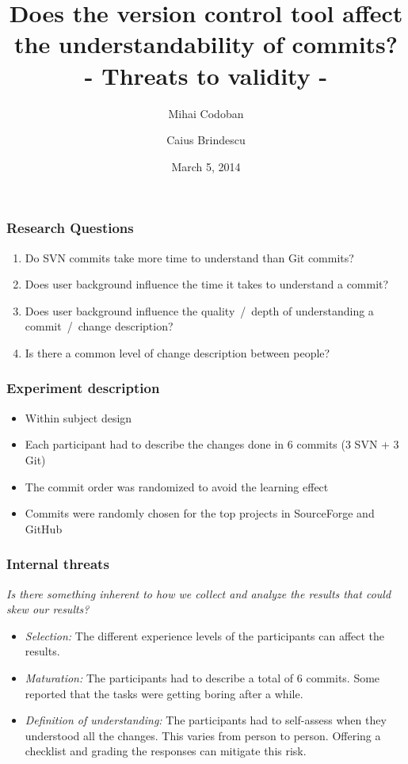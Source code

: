 \documentclass{beamer}
\title{Does the version control tool affect the understandability of commits? \\ - Threats to validity - }
\author{Mihai Codoban \and Caius Brindescu}
\date{March 5, 2014}
\begin{document}
\begin{frame}
\titlepage
\end{frame}

\begin{frame}
\frametitle{Research Questions}
\begin{enumerate}
	\item Do SVN commits take more time to understand than Git commits?
	\item Does user background influence the time it takes to understand a commit?
	\item Does user background influence the quality~/~depth of understanding a commit~/~change description?
	\item Is there a common level of change description between people?
\end{enumerate}
\end{frame}

\begin{frame}
\frametitle{Experiment description}
\begin{itemize}
	\item Within subject design
	\item Each participant had to describe the changes done in 6 commits (3 SVN + 3 Git)
	\item The commit order was randomized to avoid the learning effect
	\item Commits were randomly chosen for the top projects in SourceForge and GitHub
\end{itemize}
\end{frame}

\begin{frame}
\frametitle{Internal threats}
\emph{Is there something inherent to how we collect and analyze the results that could skew our results?}

\begin{itemize}
	\item{\emph{Selection:}} The different experience levels of the participants can affect the results.
	\item{\emph{Maturation:}} The participants had to describe a total of 6 commits.
	Some reported that the tasks were getting boring after a while.
	\item{\emph{Definition of understanding:}} The participants had to self-assess when they understood all the changes. 
	This varies from person to person. 
	Offering a checklist and grading the responses can mitigate this risk.
\end{itemize}
\end{frame}
\end{document}
